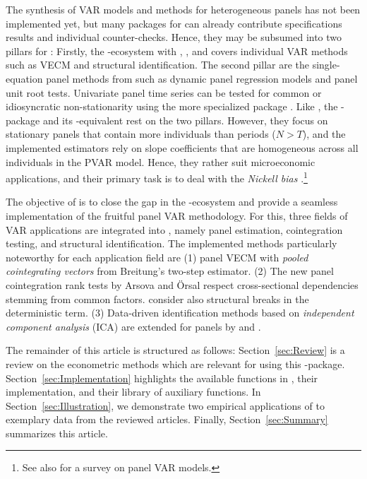 The synthesis of VAR models and methods for heterogeneous panels has not been implemented yet, but many packages for  \citeyearpar{RCore2020} can already contribute specifications results and individual counter-checks. Hence, they may be subsumed into two pillars for : Firstly, the -ecosystem with  \citep{Pfaff2008},  \citep{Pfaff2008a}, and  \citep{LangeEtAl_fc} covers individual VAR methods such as VECM and structural identification. The second pillar are the single-equation panel methods from  \citep{CroissantMillo2008} such as dynamic panel regression models and panel unit root tests. Univariate panel time series can be tested for common or idiosyncratic non-stationarity using the more specialized package  \citep{Bronder2016}. Like , the -package  \citep{SigmundFerstl2019} and its -equivalent  \citep{AbrigoLove2016} rest on the two pillars. However, they focus on stationary panels that contain more individuals than periods ($ N > T $), and the implemented estimators rely on slope coefficients that are homogeneous across all individuals in the PVAR model. Hence, they rather suit microeconomic applications, and their primary task is to deal with the \textit{Nickell bias} \citeyearpar{Nickell1981}.\footnote{See also \citet{CanovaCiccarelli2013} for a survey on panel VAR models.} 

The objective of  is to close the gap in the -ecosystem and provide a seamless implementation of the fruitful panel VAR methodology. For this, three fields of VAR applications are integrated into , namely  panel estimation, cointegration testing, and structural identification. The implemented methods particularly noteworthy for each application field are (1) panel VECM with \textit{pooled cointegrating vectors} from Breitung's \citeyearpar{Breitung2005} two-step estimator. (2) The new panel cointegration rank tests by Arsova and Örsal \citeyearpar{ArsovaOersal2017,ArsovaOersal2018} respect cross-sectional dependencies stemming from common factors. \citet{ArsovaOersal2020} consider also structural breaks in the deterministic term. (3) Data-driven identification methods based on \textit{independent component analysis} (ICA) are extended for panels by \citet{CalhounEtAl2002} and \cite{Herwartz2017}.

The remainder of this article is structured as follows: Section~\ref{sec:Review} is a review on the econometric methods which are relevant for using this -package. Section~\ref{sec:Implementation} highlights the available functions in , their implementation, and their library of auxiliary functions. In Section~\ref{sec:Illustration}, we demonstrate two empirical applications of  to exemplary data from the reviewed articles. Finally, Section~\ref{sec:Summary} summarizes this article. 


